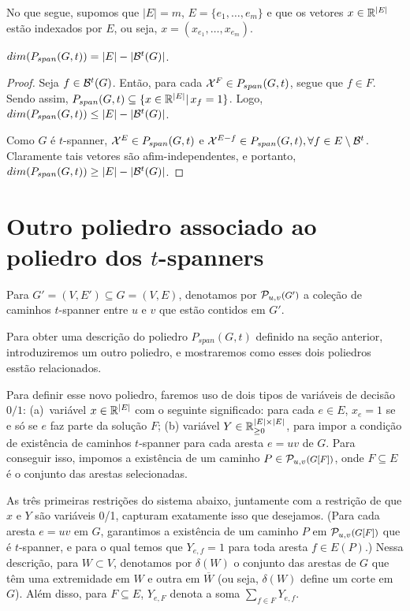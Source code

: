 No que segue, supomos que $|E|=m$, $E=\{e_1, \ldots, e_m\}$ e que os
vetores $x\in \mathbb{R}^{|E|}$ estão indexados por $E$, ou seja,
$x=(x_{e_1}, \ldots, x_{e_m})$.


\begin{lema}
$dim(P_{span}(G,t)) = |E| - |\mathcal{B}^{t}(G)|$.
\begin{proof}
Seja $f \in \mathcal{B}^{t}(G)$. Então, para cada $\mathcal{X}^{F} \in P_{span}(G,t)$, segue que 
$f \in F$. Sendo assim, $P_{span}(G,t) \subseteq \{x \in \mathbb{R}^{|E|} | \, x_f = 1\}$. Logo, 
$dim(P_{span}(G,t)) \le |E| - |\mathcal{B}^{t}(G)|$.

Como $G$ é $t$-spanner, $\mathcal{X}^{E} \in P_{span}(G,t)$ e 
$\mathcal{X}^{E-f} \in P_{span}(G,t), \forall f \in E \setminus
\mathcal{B}^{t}$. Claramente tais vetores são afim-independentes, e portanto, 
$dim(P_{span}(G,t)) \ge |E| - |\mathcal{B}^{t}(G)|$. 
\end{proof}
\end{lema}

\section{Outro poliedro associado ao poliedro dos 
  \hbox{$t$-spanners}}
\label{sec:formulacao}

 Para $G' = (V, E') \subseteq G = (V,E)$, denotamos por
 $\PathuvGprime$ a coleção de caminhos
 $t$-spanner entre $u$ e $v$ que estão contidos em $G'$.

Para obter uma descrição do poliedro $P_{span}(G,t)$ definido na seção anterior,
introduziremos um outro poliedro, e mostraremos como esses dois poliedros esstão relacionados. 

Para definir esse novo poliedro, faremos uso de dois tipos de
variáveis de decisão $0/1$: (a)~variável $x \in \mathbb{R}^{|E|}$ com o
seguinte significado: para cada $e \in E$, $x_e = 1$ se e só se $e$
faz parte da solução $F$; (b) variável $Y \in \mathbb{R}^{|E| \times |E|}_{\ge 0}$, para impor a
condição de existência de caminhos $t$-spanner para cada aresta $e=uv$
de $G$. Para conseguir isso, impomos a existência de um caminho
$P \in \PathuvF$, onde $F \subseteq E$ é o conjunto das arestas
selecionadas.


As três primeiras restrições do sistema abaixo, juntamente com a
restrição de que $x$ e $Y$ são variáveis 0/1, capturam exatamente isso
que desejamos.  (Para cada aresta $e=uv$ em $G$, garantimos a
existência de um caminho $P$ em $\PathuvF$ que é $t$-spanner, e para o
qual temos que $Y_{e,f} = 1$ para toda aresta $f \in E(P)$.)  Nessa
descrição, para $W \subset V$, denotamos por $\delta(W)$ o conjunto
das arestas de $G$ que têm uma extremidade em $W$ e outra em
$\overline W$ (ou seja, $\delta(W)$ define um corte em $G$).  Além
disso, para $F \subseteq E$, $Y_{e,F}$ denota a soma
$\sum_{f \in F}Y_{e,f}$.

